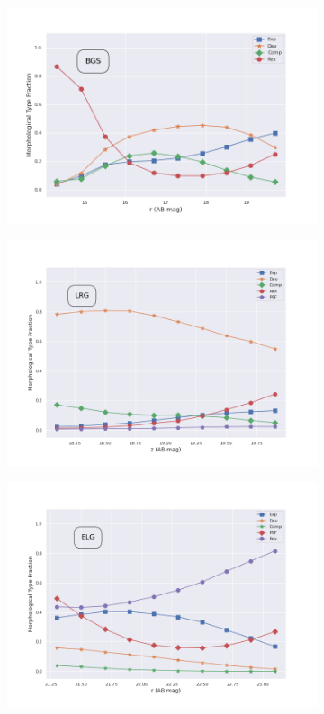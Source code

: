 \begin{figure}
\begin{subfigure}{.5\textwidth}
\centering
\includegraphics[width=1\linewidth]{images/gmm/bgs_morph.png}
\caption{}
\end{subfigure}
\hfill
\begin{subfigure}{.5\textwidth}
\centering
\includegraphics[width=1\linewidth]{images/gmm/lrg_morph.png}
\caption{}
\end{subfigure}
\hfill
\begin{subfigure}{.5\textwidth}
\centering
\includegraphics[width=1\linewidth]{images/gmm/elg_morph.png}

\end{subfigure}
\end{figure}
